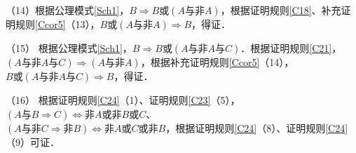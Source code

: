 \documentclass[12pt, a4paper, oneside]{book}
\begin{document}
			（14）根据公理模式\ref{Sch1}，$B\Rightarrow B\text{或}(A\text{与}\text{非}A)$，根据证明规则\ref{C18}、补充证明规则\ref{Ccor5}（13），$B\text{或}(A\text{与}\text{非}A)\Rightarrow B$，得证．
			\par
			（15）	根据公理模式\ref{Sch1}，$B\Rightarrow B\text{或}(A\text{与}\text{非}A\text{与}C)$．根据证明规则\ref{C21}，$(A\text{与}\text{非}A\text{与}C)\Rightarrow (A\text{与}\text{非}A)$，根据补充证明规则\ref{Ccor5}（14），$B\text{或}(A\text{与}\text{非}A\text{与}C)\Rightarrow B$，得证．
			\par
			（16）	根据证明规则\ref{C24}（1）、证明规则\ref{C23}（5），$(A\text{与}B\Rightarrow C)\Leftrightarrow \text{非}A\text{或}\text{非}B\text{或}C$、\\$(A\text{与}\text{非}C\Rightarrow \text{非}B)\Leftrightarrow \text{非}A\text{或}C\text{或}\text{非}B$，根据证明规则\ref{C24}（8）、证明规则\ref{C24}（9）可证．
			
\end{document}
